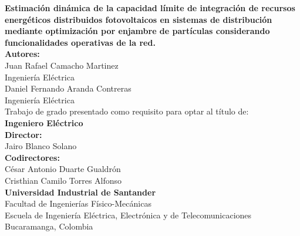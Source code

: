 \documentclass[12pt, twoside, letterpaper]{book}
\begin{document}
\frontmatter

\begin{titlepage}
    \centering
    \vspace*{1cm}
    {\Huge \textbf{Estimación dinámica de la capacidad límite de integración de recursos energéticos distribuidos fotovoltaicos en sistemas de distribución mediante optimización por enjambre de partículas considerando funcionalidades operativas de la red.}}\\[1.5cm]

    {\Large \textbf{Autores:}}\\[0.3cm]
    {\Large Juan Rafael Camacho Martinez}\\
    {\normalsize Ingeniería Eléctrica}\\[0.3cm]
    {\Large Daniel Fernando Aranda Contreras}\\
    {\normalsize Ingeniería Eléctrica}\\[1.5cm]

    {\large Trabajo de grado presentado como requisito para optar al título de:}\\[0.3cm]
    {\large \textbf{Ingeniero Eléctrico}}\\[1.5cm]

    {\large \textbf{Director:}}\\
    {\large Jairo Blanco Solano}\\[0.5cm]

    {\large \textbf{Codirectores:}}\\
    {\large César Antonio Duarte Gualdrón}\\
    {\large Cristhian Camilo Torres Alfonso}\\[1.5cm]

    \vfill
    {\Large \textbf{Universidad Industrial de Santander}}\\
    {\large Facultad de Ingenierías Físico-Mecánicas}\\
    {\large Escuela de Ingeniería Eléctrica, Electrónica y de Telecomunicaciones}\\
    {\large Bucaramanga, Colombia}\\
    {\large \the\year}
\end{titlepage}

\tableofcontents
\listoffigures
\listoftables

\mainmatter



\backmatter

\printbibliography[heading=bibintoc, title={Referencias Bibliográficas}]
\end{document}
